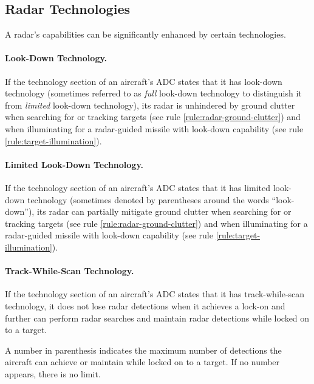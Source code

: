 \begin{advancedrules}
{%

}{

\section{Radar Technologies}
\label{rule:radar-technology}

A radar's capabilities can be significantly enhanced by certain technologies.

\paragraph{Look-Down Technology.} \label{rule:look-down-technology} \label{rule:look-down-missiles}
If the technology section of an aircraft’s ADC states that it has look-down technology (sometimes referred to as \emph{full} look-down technology to distinguish it from \emph{limited} look-down technology), its radar is unhindered by ground clutter when searching for or tracking targets (see rule \ref{rule:radar-ground-clutter}) and when illuminating for a radar-guided missile with look-down capability (see rule \ref{rule:target-illumination}).

\paragraph{Limited Look-Down Technology.} \label{rule:limited-look-down-technology} If the technology section of an aircraft’s ADC states that it has limited look-down technology (sometimes denoted by parentheses around the words “look-down”), its radar can partially mitigate ground clutter when searching for or tracking targets (see rule \ref{rule:radar-ground-clutter}) and when illuminating for a radar-guided missile with look-down capability (see rule \ref{rule:target-illumination}).


\paragraph{Track-While-Scan Technology.} \label{rule:track-while-scan-technology} If the technology section of an aircraft’s ADC states that it has track-while-scan technology, it does not lose radar detections when it achieves a lock-on and further can perform radar searches and maintain radar detections while locked on to a target.

A number in parenthesis indicates the maximum number of detections the aircraft can achieve or maintain while locked on to a target. If no number appears, there is no limit.

}
\end{advancedrules}
